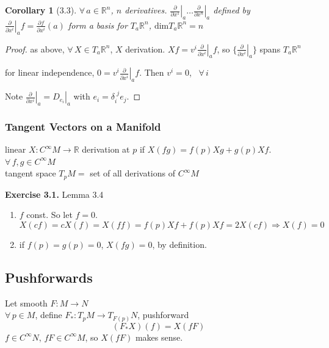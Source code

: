 \documentclass[11pt]{amsart}
\newtheorem{corollary}{Corollary}
\theoremstyle{definition}
\newcommand{\exercisehead}[1]{\medskip\noindent\textbf{Exercise #1.} }
\begin{document}
\begin{corollary}[3.3]
$\forall \, a \in \mathbb{R}^n$, $n$ derivatives.  $ \left. \frac{ \partial }{ \partial x^1 } \right|_a \dots \left. \frac{ \partial }{ \partial x^n} \right|_a$ defined by $ \left. \frac{ \partial }{ \partial x^i} \right|_a f = \frac{ \partial f}{ \partial x^i}(a)$ form a basis for $T_a \mathbb{R}^n$, $\text{dim}{ T_a \mathbb{R}^n} = n$
\end{corollary}

\begin{proof}
as above, $\forall \, X \in T_a\mathbb{R}^n$, $X$ derivation.  $Xf = v^i \left. \frac{ \partial }{ \partial x^i } \right|_a f $, so $\lbrace  \left. \frac{ \partial }{ \partial x^i } \right|_a \rbrace$ spans $T_a \mathbb{R}^n$

for linear independence, $0 = v^i \left. \frac{ \partial }{ \partial x^i } \right|_a f$.  Then $v^i = 0$, \, $\forall \, i$

Note $\left. \frac{ \partial }{ \partial x^i } \right|_a = \left. D_{e_i} \right|_a$ with $e_i = \delta_i^{\, \, j} e_j$.

\end{proof}

\subsubsection*{Tangent Vectors on a Manifold}

linear $X: C^{\infty}M  \to \mathbb{R}$ derivation at $p$ if $X(fg) = f(p) Xg + g(p) Xf$.  $\forall\, f,g \in C^{\infty}M$  \\
tangent space $T_pM = $ set of all derivations of $C^{\infty}M$

\exercisehead{3.1} Lemma 3.4
\begin{enumerate}
\item[(a)] $f$ const. So let $f=0$.
\[
X(cf) = cX(f) = X(ff) = f(p) Xf + f(p) Xf = 2X(cf) \Longrightarrow X(f) = 0
\]
\item[(b)] if $f(p) = g(p) = 0 $, $X(fg) = 0$, by definition.
\end{enumerate}


\subsection*{Pushforwards}

Let smooth $F: M \to N$  \\ $\forall \, p \in M$, define $F_* : T_p M \to T_{F(p)}N$, pushforward
\[
(F_*X)(f) = X(fF)
\]
$f\in C^{\infty}N$, $fF \in C^{\infty}M$, so $X(fF)$ makes sense.
\end{document}
